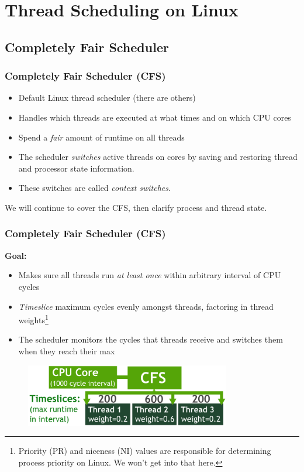 \documentclass{beamer}
\newcommand{\linespace}{\vskip 0.25cm}
\begin{document}
\section[Thread Scheduling]{Thread Scheduling on Linux}
\subsection[CFS]{Completely Fair Scheduler}
\begin{frame}
\frametitle{Completely Fair Scheduler (CFS)}

\begin{itemize}
\item Default Linux thread scheduler (there are others)
\item Handles which threads are executed at what times and on which CPU cores
\item Spend a \emph{fair} amount of runtime on all threads

\linespace

\item The scheduler \emph{switches} active threads on cores by saving and restoring thread and processor state information.
\item These switches are called \emph{context switches}.
\end{itemize}

We will continue to cover the CFS, then clarify process and thread state.
\end{frame}

\begin{frame}
\frametitle{Completely Fair Scheduler (CFS)}

\textbf{Goal:}
\begin{itemize}
\item Makes sure all threads run \emph{at least once} within arbitrary interval of CPU cycles
\item \emph{Timeslice} maximum cycles evenly amongst threads, factoring in thread weights\footnote{Priority (PR) and niceness (NI) values are responsible for determining process priority on Linux. We won't get into that here.}
\item The scheduler monitors the cycles that threads receive and switches them when they reach their max
\end{itemize}

\begin{figure}
		\includegraphics[width=0.8\textwidth]{Illustrations/CFS}
		\label{fig:cfs}
\end{figure}

\linespace

\end{frame}
\end{document}
